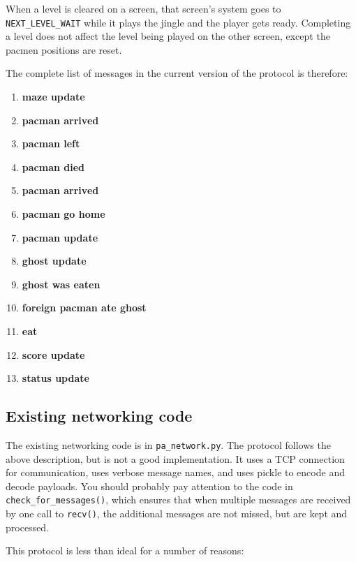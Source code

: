 \documentclass{article}
\begin{document}
When a  level is  cleared on  a screen, that  screen's system  goes to
{\tt NEXT\_LEVEL\_WAIT} while it  plays the jingle and the  player gets ready.
Completing a level does not affect the level being played on the other
screen, except the pacmen positions are reset.

The complete list of messages in the current version of the protocol is therefore:
\begin{enumerate}
\item {\bf maze update}
\item {\bf pacman arrived}
\item {\bf pacman left}
\item {\bf pacman died}
\item {\bf pacman arrived}
\item {\bf pacman go home}
\item {\bf pacman update}
\item {\bf ghost update}
\item {\bf ghost was eaten}
\item {\bf foreign pacman ate ghost}
\item {\bf eat}
\item {\bf score update}
\item {\bf status update}
\end{enumerate}

\subsection{Existing networking code}

The existing networking code is in {\tt pa\_network.py}.  The protocol
follows the above description, but is not a good implementation.  It
uses a TCP connection for communication, uses verbose message names,
and uses pickle to encode and decode payloads.  You should probably
pay attention to the code in {\tt check\_for\_messages()}, which ensures that
when multiple messages are received by one call to {\tt recv()}, the
additional messages are not missed, but are kept and processed.

This protocol is less than ideal for a number of reasons:
\end{document}
